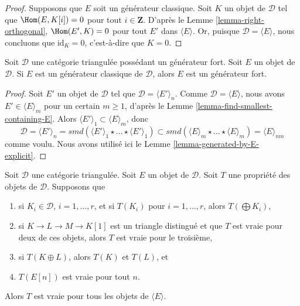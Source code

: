 \begin{proof}
Supposons que $E$ soit un générateur classique. Soit $K$ un objet de
$\mathcal{D}$ tel que $\Hom(E, K[i]) = 0$ pour tout $i \in \mathbf{Z}$.
D'après le Lemme \ref{lemma-right-orthogonal}, $\Hom(E', K) = 0$ pour tout
$E'$ dans $\langle E \rangle$. Or, puisque
$\mathcal{D} = \langle E \rangle$, nous concluons que
$\text{id}_K = 0$, c'est-à-dire que $K = 0$.
\end{proof}

\begin{lemma}
\label{lemma-classical-generator-strong-generator}
Soit $\mathcal{D}$ une catégorie triangulée possédant un générateur fort.
Soit $E$ un objet de $\mathcal{D}$. Si $E$ est un générateur classique de
$\mathcal{D}$, alors $E$ est un générateur fort.
\end{lemma}

\begin{proof}
Soit $E'$ un objet de $\mathcal{D}$ tel que
$\mathcal{D} = \langle E' \rangle_n$. Comme
$\mathcal{D} = \langle E \rangle$, nous avons
$E' \in \langle E \rangle_m$ pour un certain $m \geq 1$, d'après le
Lemme \ref{lemma-find-smallest-containing-E}.
Alors $\langle E' \rangle_1 \subset \langle E \rangle_m$, donc
$$
\mathcal{D} =
\langle E' \rangle_n = smd(
\langle E' \rangle_1 \star \ldots \star \langle E' \rangle_1)
\subset
smd(
\langle E \rangle_m \star \ldots \star \langle E \rangle_m)
=
\langle E \rangle_{nm}
$$
comme voulu. Nous avons utilisé ici le
Lemme \ref{lemma-generated-by-E-explicit}.
\end{proof}

\begin{remark}
\label{remark-check-on-generator}
Soit $\mathcal{D}$ une catégorie triangulée. Soit $E$ un objet de
$\mathcal{D}$. Soit $T$ une propriété des objets de $\mathcal{D}$.
Supposons que
\begin{enumerate}
\item si $K_i \in \mathcal{D}$, $i = 1, \ldots, r$, et si $T(K_i)$ pour
$i = 1, \ldots, r$, alors $T(\bigoplus K_i)$,
\item si $K \to L \to M \to K[1]$ est un triangle distingué et que $T$ est
vraie pour deux de ces objets, alors $T$ est vraie pour le troisième,
\item si $T(K \oplus L)$, alors $T(K)$ et $T(L)$, et
\item $T(E[n])$ est vraie pour tout $n$.
\end{enumerate}
Alors $T$ est vraie pour tous les objets de $\langle E \rangle$.
\end{remark}


